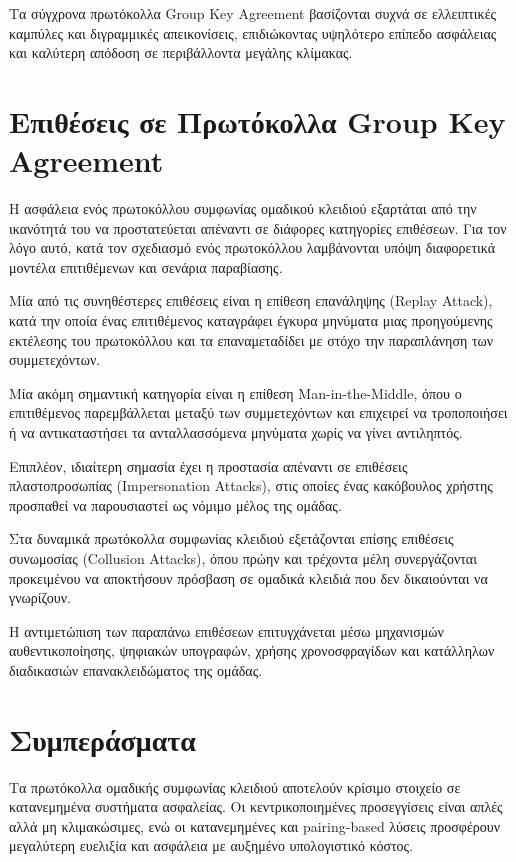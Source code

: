 \documentclass[12pt,a4paper]{report}
\begin{document}
Τα σύγχρονα πρωτόκολλα Group Key Agreement βασίζονται συχνά σε ελλειπτικές καμπύλες και διγραμμικές απεικονίσεις, επιδιώκοντας υψηλότερο επίπεδο ασφάλειας και καλύτερη απόδοση σε περιβάλλοντα μεγάλης κλίμακας.

\section{Επιθέσεις σε Πρωτόκολλα Group Key Agreement}

Η ασφάλεια ενός πρωτοκόλλου συμφωνίας ομαδικού κλειδιού εξαρτάται από την ικανότητά του να προστατεύεται απέναντι σε διάφορες κατηγορίες επιθέσεων. Για τον λόγο αυτό, κατά τον σχεδιασμό ενός πρωτοκόλλου λαμβάνονται υπόψη διαφορετικά μοντέλα επιτιθέμενων και σενάρια παραβίασης.

Μία από τις συνηθέστερες επιθέσεις είναι η επίθεση επανάληψης (Replay Attack), κατά την οποία ένας επιτιθέμενος καταγράφει έγκυρα μηνύματα μιας προηγούμενης εκτέλεσης του πρωτοκόλλου και τα επαναμεταδίδει με στόχο την παραπλάνηση των συμμετεχόντων.

Μία ακόμη σημαντική κατηγορία είναι η επίθεση Man-in-the-Middle, όπου ο επιτιθέμενος παρεμβάλλεται μεταξύ των συμμετεχόντων και επιχειρεί να τροποποιήσει ή να αντικαταστήσει τα ανταλλασσόμενα μηνύματα χωρίς να γίνει αντιληπτός.

Επιπλέον, ιδιαίτερη σημασία έχει η προστασία απέναντι σε επιθέσεις πλαστοπροσωπίας (Impersonation Attacks), στις οποίες ένας κακόβουλος χρήστης προσπαθεί να παρουσιαστεί ως νόμιμο μέλος της ομάδας.

Στα δυναμικά πρωτόκολλα συμφωνίας κλειδιού εξετάζονται επίσης επιθέσεις συνωμοσίας (Collusion Attacks), όπου πρώην και τρέχοντα μέλη συνεργάζονται προκειμένου να αποκτήσουν πρόσβαση σε ομαδικά κλειδιά που δεν δικαιούνται να γνωρίζουν.

Η αντιμετώπιση των παραπάνω επιθέσεων επιτυγχάνεται μέσω μηχανισμών αυθεντικοποίησης, ψηφιακών υπογραφών, χρήσης χρονοσφραγίδων και κατάλληλων διαδικασιών επανακλειδώματος της ομάδας.

\section{Συμπεράσματα}

Τα πρωτόκολλα ομαδικής συμφωνίας κλειδιού αποτελούν κρίσιμο στοιχείο σε κατανεμημένα συστήματα ασφαλείας. Οι κεντρικοποιημένες προσεγγίσεις είναι απλές αλλά μη κλιμακώσιμες, ενώ οι κατανεμημένες και pairing-based λύσεις προσφέρουν μεγαλύτερη ευελιξία και ασφάλεια με αυξημένο υπολογιστικό κόστος.
\end{document}
